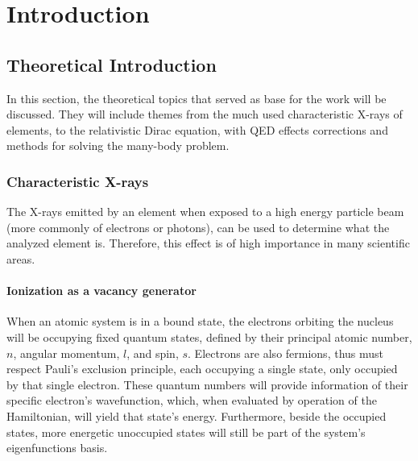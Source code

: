 
%

\chapter{Introduction}\label{cha:introduction}

\section{Theoretical Introduction}
In this section, the theoretical topics that served as base for the work will be discussed. They will include themes from the much used characteristic X-rays of elements, to the relativistic Dirac equation, with \gls{QED} effects corrections and methods for solving the many-body problem.


\subsection{Characteristic X-rays}

The X-rays emitted by an element when exposed to a high energy particle beam (more commonly of electrons or photons), can be used to determine what the analyzed element is. Therefore, this effect is of high importance in many scientific areas.

\subsubsection{Ionization as a vacancy generator}

When an atomic system is in a bound state, the electrons orbiting the nucleus will be occupying fixed quantum states, defined by their principal atomic number, $n$, angular momentum, $l$, and spin, $s$. Electrons are also fermions, thus must respect Pauli's exclusion principle, each occupying a single state, only occupied by that single electron.
 These quantum numbers will provide information of their specific electron's wavefunction, which, when evaluated by operation of the Hamiltonian, will yield that state's energy.
Furthermore, beside the occupied states, more energetic unoccupied states will still be part of the system's eigenfunctions basis.

